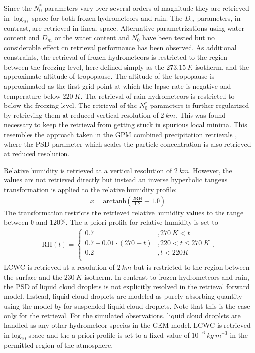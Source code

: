 \documentclass[journal abbreviation, manuscript]{copernicus}
\begin{document}
Since the $N_0^*$ parameters vary over several orders of magnitude they are
retrieved in $\log_{10}$-space for both frozen hydrometeors and rain. The $D_m$
parameters, in contrast, are retrieved in linear space. Alternative
parametrizations using water content and $D_m$ or the water content and $N_0^*$
have been tested but no considerable effect on retrieval performance has been
observed. As additional constraints, the retrieval of frozen hydrometeors is
restricted to the region between the freezing level, here defined simply as the
$273.15\ \unit{K}$-isotherm, and the approximate altitude of tropopause. The
altitude of the tropopause is approximated as the first grid point at which the
lapse rate is negative and temperature below $220\ \unit{K}$. The retrieval of
rain hydrometeors is restricted to below the freezing level. The retrieval of
the $N_0^*$ parameters is further regularized by retrieving them at reduced
vertical resolution of $2\ \unit{km}$. This was found necessary to keep the
retrieval from getting stuck in spurious local minima. This resembles the
approach taken in the GPM combined precipitation retrievals \citep{grecu16},
where the PSD parameter which scales the particle concentration is also
retrieved at reduced resolution.

Relative humidity is retrieved at a vertical resolution of $2\ \unit{km}$.
However, the values are not retrieved directly but instead an inverse
hyperbolic tangens transformation is applied to the relative humidity profile:
%
\begin{align}
x = \text{arctanh}(\frac{2 \text{RH}}{1.2} - 1.0)
\end{align}
%
The transformation restricts the retrieved relative humidity values to the range
between $0$ and $120\%$. The a priori profile for relative humidity is set to
%
\begin{align}
\text{RH}(t) = \begin{cases}
 0.7 &, 270\ \unit{K} < t \\
 0.7 - 0.01 \cdot (270 -t) & ,220 < t \leq  270\ \unit{K} \\
 0.2 &,t < 220 \unit{K} \\
 \end{cases}.
\end{align}
%
LCWC is retrieved at a resolution of $2\ \unit{km}$ but is restricted to the
region between the surface and the $230\ \unit{K}$ isotherm. In contrast to
frozen hydrometeors and rain, the PSD of liquid cloud droplets is not explicitly
resolved in the retrieval forward model. Instead, liquid cloud droplets are
modeled as purely absorbing quantity using the model by \cite{liebe93} for
suspended liquid cloud droplets. Note that this is the case only for the
retrieval. For the simulated observations, liquid cloud droplets are
handled as any other hydrometeor species in the GEM model. LCWC is retrieved in
$\text{log}_{10}$-space and the a priori profile is set to a fixed value of
$10^{-6}\ \unit{kg\ m^{-3}}$ in the permitted region of the atmosphere.
\end{document}
